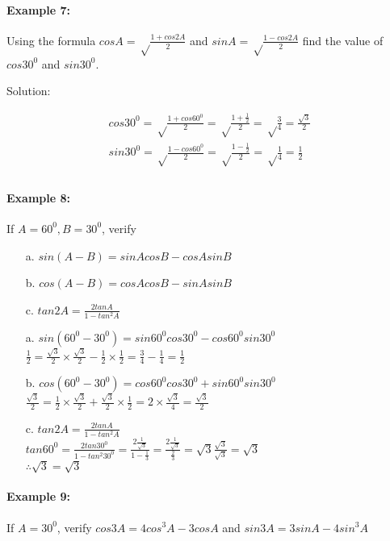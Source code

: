 \documentclass{article}
\begin{document}
\paragraph{Example 7:}
Using the formula $cos A = \sqrt\frac{1+cos2A}{2}$ and $sin A = \sqrt\frac{1-cos2A}{2}$
find the value of $cos30^{0}$ and $sin30^{0}$.

{\small Solution:}

\[
  \begin{aligned}
    cos30^{0} = \sqrt\frac{1+cos60^{0}}{2} =  \sqrt\frac{1+\frac{1}{2}}{2} = \sqrt\frac{3}{4} = \frac{\sqrt{3}}{2} \\
    sin30^{0} = \sqrt\frac{1-cos60^{0}}{2} =  \sqrt\frac{1-\frac{1}{2}}{2} = \sqrt\frac{1}{4} = \frac{1}{2} \\
  \end{aligned}
\]

\paragraph{Example 8:}
If $A = 60^{0}, B = 30^{0}$, verify

\begin{enumerate}
  \item[a.] $sin(A-B) = sinA cosB - cosA sinB$
  \item[b.] $cos(A-B) = cosA cosB - sinA sinB$
  \item[c.] $tan2A = \frac{2tanA}{1-tan^{2}A}$
  \item[a.] $sin(60^{0}-30^{0}) = sin60^{0}cos30^{0} - cos60^{0}sin30^{0}$ \\
        $ \frac{1}{2} = \frac{\sqrt{3}}{2} \times \frac{\sqrt{3}}{2} - \frac{1}{2} \times \frac{1}{2} = \frac{3}{4} - \frac{1}{4} = \frac{1}{2} $
  \item[b.] $cos(60^{0}-30^{0}) = cos60^{0}cos30^{0} + sin60^{0}sin30^{0}$ \\
        $ \frac{\sqrt{3}}{2} = \frac{1}{2} \times \frac{\sqrt{3}}{2} + \frac{\sqrt{3}}{2} \times \frac{1}{2} = 2 \times \frac{\sqrt{3}}{4} = \frac{\sqrt{3}}{2}$
  \item[c.] $tan2A = \frac{2tanA}{1-tan^{2}A}$ \\
        $ tan 60^{0} = \frac{2tan30^{0}}{1-tan^{2}30^{0}} = \frac{2\frac{1}{\sqrt{3}}}{1-\frac{1}{3}} = \frac{2\frac{1}{\sqrt{3}}}{\frac{2}{3}} = \sqrt{3} \frac{\sqrt{3}}{\sqrt{3}} = \sqrt{3}$ \\
        $\therefore \sqrt{3} = \sqrt{3}$
\end{enumerate}

\paragraph{Example 9:}
If $A = 30^{0}$, verify $cos3A = 4cos^{3}A - 3 cosA $ and $sin3A = 3sinA - 4sin^{3}A$
\end{document}
